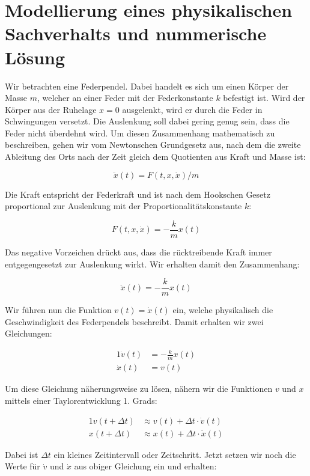 \section{Modellierung eines physikalischen Sachverhalts und nummerische Lösung}

Wir betrachten eine Federpendel. Dabei handelt es sich um einen Körper der Masse $m$, welcher an einer Feder mit der Federkonstante $k$ befestigt ist. Wird der Körper aus der Ruhelage $x=0$ ausgelenkt, wird er durch die Feder in Schwingungen versetzt. Die Auslenkung soll dabei gering genug sein, dass die Feder nicht überdehnt wird. Um diesen Zusammenhang mathematisch zu beschreiben, gehen wir vom Newtonschen Grundgesetz aus, nach dem die zweite Ableitung des Orts nach der Zeit gleich dem Quotienten aus Kraft und Masse ist:

$$
    \ddot{x}(t) = F(t,x,\dot{x}) / m
$$

Die Kraft entspricht der Federkraft und ist nach dem Hookschen Gesetz proportional zur Auslenkung mit der Proportionalitätskonstante $k$:

$$
    F(t,x,\dot{x}) = -\frac{k}{m} x(t)
$$

Das negative Vorzeichen drückt aus, dass die rücktreibende Kraft immer entgegengesetzt zur Auslenkung wirkt. Wir erhalten damit den Zusammenhang:

$$
    \ddot{x}(t) = -\frac{k}{m} x(t)
$$

Wir führen nun die Funktion $v(t) = \dot{x}(t)$ ein, welche physikalisch die Geschwindigkeit des Federpendels beschreibt. Damit erhalten wir zwei Gleichungen:

\begin{alignat*}{1}
    \dot{v}(t) &= -\frac{k}{m}x(t) \\
    \dot{x}(t) &= v(t)
\end{alignat*}

Um diese Gleichung näherungsweise zu lösen, nähern wir die Funktionen $v$ und $x$ mittels einer Taylorentwicklung 1. Grads:

\begin{alignat*}{1}
    v(t + \Delta t) &\approx v(t) + \Delta t \cdot \dot{v}(t) \\
    x(t + \Delta t) &\approx x(t) + \Delta t \cdot \dot{x}(t)
\end{alignat*}

Dabei ist $\Delta t$ ein kleines Zeitintervall oder Zeitschritt. Jetzt setzen wir noch die Werte für $\dot{v}$ und $\dot{x}$ aus obiger Gleichung ein und erhalten:

